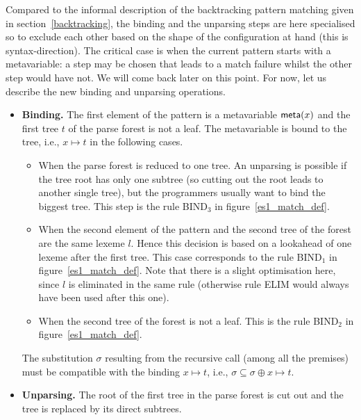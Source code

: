 Compared to the informal description of the backtracking pattern
matching given in section~\ref{backtracking}, the binding and the
unparsing steps are here specialised so to exclude each other based on
the shape of the configuration at hand (this is
syntax\hyp{}direction). The critical case is when the current pattern
starts with a meta\-variable: a step may be chosen that leads to a
match failure whilst the other step would have not. We will come back
later on this point. For now, let us describe the new binding and
unparsing operations.
\begin{itemize}

  \item \textbf{Binding.} The first element of the pattern is a
    meta\-variable \(\textsf{meta}(x)\) and the first tree \(t\) of the parse
    forest is not a leaf. The meta\-variable is bound to the tree,
    i.e., \(x \mapsto t\) in the following cases.
    \begin{itemize}

      \item When the parse forest is reduced to one tree. An unparsing
      is possible if the tree root has only one subtree (so cutting
      out the root leads to another single tree), but the programmers
      usually want to bind the biggest tree. This step is the rule
      \textsf{BIND}\(_3\) in figure~\ref{es1_match_def}.

      \item When the second element of the pattern and the second tree
      of the forest are the same lexeme \(l\). Hence this decision is
      based on a lookahead of one lexeme after the first tree. This
      case corresponds to the rule \textsf{BIND}\(_1\) in
      figure~\ref{es1_match_def}. Note that there is a slight
      optimisation here, since \(l\) is eliminated in the same rule
      (otherwise rule \textsf{ELIM} would always have been used after
      this one).

      \item When the second tree of the forest is not a leaf. This is
      the rule \textsf{BIND}\(_2\) in figure~\ref{es1_match_def}.

    \end{itemize}
    The substitution \(\sigma\) resulting from the recursive call
    (among all the premises) must be compatible with the binding \(x
    \mapsto t\), i.e., \(\sigma \subseteq \sigma \oplus x \mapsto t\).

  \item \textbf{Unparsing.} The root of the first tree in the parse
  forest is cut out and the tree is replaced by its direct
  subtrees.
    \begin{itemize}


\end{itemize}
\end{itemize}
